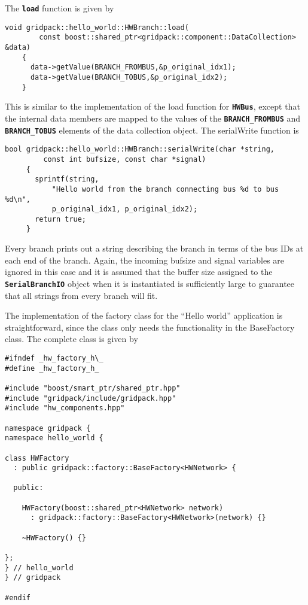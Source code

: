 The \texttt{\textbf{load}} function is given by

{
\color{red}
\begin{Verbatim}[fontseries=b]
    void gridpack::hello_world::HWBranch::load(
        const boost::shared_ptr<gridpack::component::DataCollection> &data)
    {
      data->getValue(BRANCH_FROMBUS,&p_original_idx1);
      data->getValue(BRANCH_TOBUS,&p_original_idx2);
    }
\end{Verbatim}
}

This is similar to the implementation of the load function for \texttt{\textbf{HWBus}}, except that the internal data members are mapped to the values of the \texttt{\textbf{BRANCH\_FROMBUS}} and \texttt{\textbf{BRANCH\_TOBUS}} elements of the data collection object. The serialWrite function is

{
\color{red}
\begin{Verbatim}[fontseries=b]
     bool gridpack::hello_world::HWBranch::serialWrite(char *string,
         const int bufsize, const char *signal)
     {
       sprintf(string,
           "Hello world from the branch connecting bus %d to bus %d\n",
           p_original_idx1, p_original_idx2);
       return true;
     }
\end{Verbatim}
}

Every branch prints out a string describing the branch in terms of the bus IDs at each end of the branch. Again, the incoming bufsize and signal variables are ignored in this case and it is assumed that the buffer size assigned to the \texttt{\textbf{SerialBranchIO}} object when it is instantiated is sufficiently large to guarantee that all strings from every branch will fit. 

The implementation of the factory class for the ``Hello world'' application is straightforward, since the class only needs the functionality in the BaseFactory class. The complete class is given by

{
\color{red}
\begin{Verbatim}[fontseries=b]
#ifndef _hw_factory_h\_
#define _hw_factory_h_

#include "boost/smart_ptr/shared_ptr.hpp"
#include "gridpack/include/gridpack.hpp"
#include "hw_components.hpp"

namespace gridpack {
namespace hello_world {

class HWFactory
  : public gridpack::factory::BaseFactory<HWNetwork> {

  public:

    HWFactory(boost::shared_ptr<HWNetwork> network)
      : gridpack::factory::BaseFactory<HWNetwork>(network) {}

    ~HWFactory() {}

};
} // hello_world
} // gridpack

#endif
\end{Verbatim}
}

